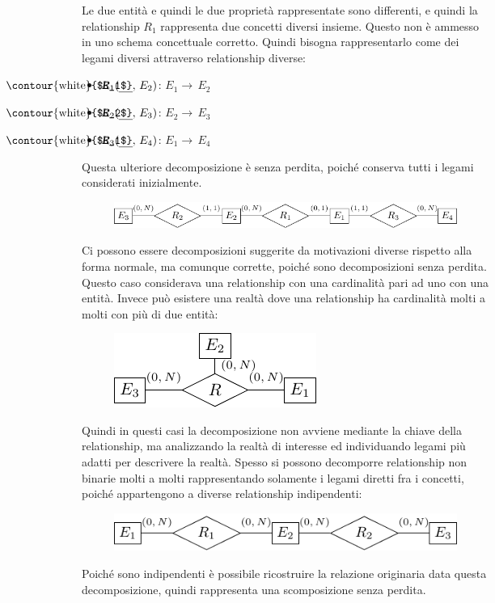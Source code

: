 \documentclass{article}
\numberwithin{equation}{subsection}
\newcommand{\myuline}[1]{%
  \uline{\phantom{#1}}%
  \llap{\contour{white}{#1}}%
}
\begin{document}
Le due entità e quindi le due proprietà rappresentate sono differenti, e quindi la relationship $R_1$ rappresenta due concetti diversi insieme. Questo non è ammesso in uno schema concettuale corretto. Quindi bisogna rappresentarlo come dei legami diversi 
attraverso relationship diverse:
\begin{itemize}
    \item $R_1(\text{\myuline{$E_1$}},\,E_2)$: $E_1\to\,E_2$
    \item $R_2(\text{\myuline{$E_2$}},\,E_3)$: $E_2\to\,E_3$
    \item $R_3(\text{\myuline{$E_1$}},\,E_4)$: $E_1\to\,E_4$
\end{itemize}
Questa ulteriore decomposizione è senza perdita, poiché conserva tutti i legami considerati inizialmente. 

\begin{figure}[H]%
    \centering%
    \includegraphics[scale=1.2]{normalizzazione_relationship_quaternaria_2.pdf}%
\end{figure}

Ci possono essere decomposizioni suggerite da motivazioni diverse rispetto alla forma normale, ma comunque corrette, poiché sono decomposizioni senza perdita. 
Questo caso considerava una relationship con una cardinalità pari ad uno con una entità. Invece può esistere una realtà dove una relationship ha cardinalità 
molti a molti con più di due entità:

\begin{figure}[H]%
    \centering%
    \includegraphics[scale=1.2]{relationship_ternaria.pdf}%
\end{figure}
Quindi in questi casi la decomposizione non avviene mediante la chiave della relationship, ma analizzando la realtà di 
interesse ed individuando legami più adatti per descrivere la realtà. Spesso si possono decomporre relationship non binarie molti a molti rappresentando solamente i legami diretti fra i concetti, poiché appartengono a diverse relationship indipendenti:
\begin{figure}[H]%
    \centering%
    \includegraphics[scale=1.2]{normalizzazione_relationship_ternaria.pdf}%
\end{figure}
Poiché sono indipendenti è possibile ricostruire la relazione originaria data questa decomposizione, quindi rappresenta una scomposizione senza perdita. 

\clearpage
\end{document}
